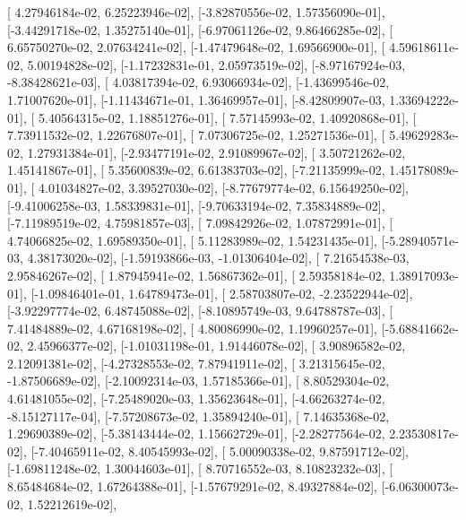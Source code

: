 \documentclass{article}
\begin{document}
       [ 4.27946184e-02,  6.25223946e-02],
       [-3.82870556e-02,  1.57356090e-01],
       [-3.44291718e-02,  1.35275140e-01],
       [-6.97061126e-02,  9.86466285e-02],
       [ 6.65750270e-02,  2.07634241e-02],
       [-1.47479648e-02,  1.69566900e-01],
       [ 4.59618611e-02,  5.00194828e-02],
       [-1.17232831e-01,  2.05973519e-02],
       [-8.97167924e-03, -8.38428621e-03],
       [ 4.03817394e-02,  6.93066934e-02],
       [-1.43699546e-02,  1.71007620e-01],
       [-1.11434671e-01,  1.36469957e-01],
       [-8.42809907e-03,  1.33694222e-01],
       [ 5.40564315e-02,  1.18851276e-01],
       [ 7.57145993e-02,  1.40920868e-01],
       [ 7.73911532e-02,  1.22676807e-01],
       [ 7.07306725e-02,  1.25271536e-01],
       [ 5.49629283e-02,  1.27931384e-01],
       [-2.93477191e-02,  2.91089967e-02],
       [ 3.50721262e-02,  1.45141867e-01],
       [ 5.35600839e-02,  6.61383703e-02],
       [-7.21135999e-02,  1.45178089e-01],
       [ 4.01034827e-02,  3.39527030e-02],
       [-8.77679774e-02,  6.15649250e-02],
       [-9.41006258e-03,  1.58339831e-01],
       [-9.70633194e-02,  7.35834889e-02],
       [-7.11989519e-02,  4.75981857e-03],
       [ 7.09842926e-02,  1.07872991e-01],
       [ 4.74066825e-02,  1.69589350e-01],
       [ 5.11283989e-02,  1.54231435e-01],
       [-5.28940571e-03,  4.38173020e-02],
       [-1.59193866e-03, -1.01306404e-02],
       [ 7.21654538e-03,  2.95846267e-02],
       [ 1.87945941e-02,  1.56867362e-01],
       [ 2.59358184e-02,  1.38917093e-01],
       [-1.09846401e-01,  1.64789473e-01],
       [ 2.58703807e-02, -2.23522944e-02],
       [-3.92297774e-02,  6.48745088e-02],
       [-8.10895749e-03,  9.64788787e-03],
       [ 7.41484889e-02,  4.67168198e-02],
       [ 4.80086990e-02,  1.19960257e-01],
       [-5.68841662e-02,  2.45966377e-02],
       [-1.01031198e-01,  1.91446078e-02],
       [ 3.90896582e-02,  2.12091381e-02],
       [-4.27328553e-02,  7.87941911e-02],
       [ 3.21315645e-02, -1.87506689e-02],
       [-2.10092314e-03,  1.57185366e-01],
       [ 8.80529304e-02,  4.61481055e-02],
       [-7.25489020e-03,  1.35623648e-01],
       [-4.66263274e-02, -8.15127117e-04],
       [-7.57208673e-02,  1.35894240e-01],
       [ 7.14635368e-02,  1.29690389e-02],
       [-5.38143444e-02,  1.15662729e-01],
       [-2.28277564e-02,  2.23530817e-02],
       [-7.40465911e-02,  8.40545993e-02],
       [ 5.00090338e-02,  9.87591712e-02],
       [-1.69811248e-02,  1.30044603e-01],
       [ 8.70716552e-03,  8.10823232e-03],
       [ 8.65484684e-02,  1.67264388e-01],
       [-1.57679291e-02,  8.49327884e-02],
       [-6.06300073e-02,  1.52212619e-02],
\end{document}
